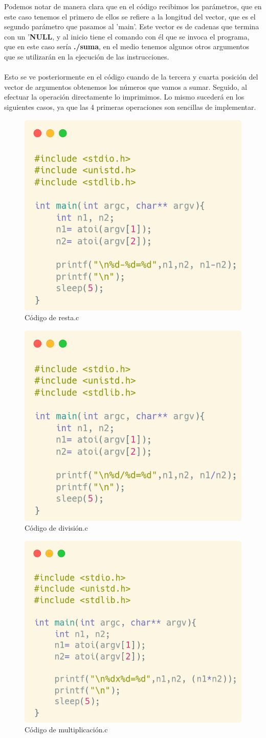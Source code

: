 \documentclass[10pt]{article}
\begin{document}
	Podemos notar de manera clara que en el código recibimos los parámetros, que en este caso tenemos el primero de ellos se refiere a la longitud del vector, que es el segundo parámetro que pasamos al 'main'. Este vector es de cadenas que termina con un '\textbf{NULL}, y al inicio tiene el comando con él que se invoca el programa, que en este caso sería \textbf{./suma}, en el medio tenemos algunos otros argumentos que se utilizarán en la ejecución de las instrucciones. 
	\\\\ 
	Esto se ve posteriormente en el código cuando de la tercera y cuarta posición del vector de argumentos obtenemos los números que vamos a sumar. Seguido, al efectuar la operación directamente lo imprimimos. Lo mismo sucederá en los siguientes casos, ya que las 4 primeras operaciones son sencillas de implementar. 
	\begin{figure}[h!]
		\centering
		\includegraphics[width=0.5\linewidth]{resta.png}
		\caption{Código de resta.c}
		\label{fig:resta}
	\end{figure}
	\begin{figure}[h!]
		\centering
		\includegraphics[width=0.5\linewidth]{division.png}
		\caption{Código de división.c}
		\label{fig:divsion}
	\end{figure}
	\begin{figure}[h!]
		\centering
		\includegraphics[width=0.5\linewidth]{multiplicacion.png}
		\caption{Código de multiplicación.c}
		\label{fig:multiplicacion}
	\end{figure}
\end{document}

